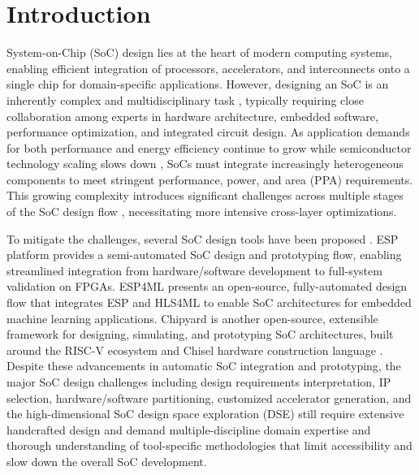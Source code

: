 \section{Introduction}
System-on-Chip (SoC) design lies at the heart of modern computing systems, enabling efficient integration of processors, accelerators, and interconnects onto a single chip for domain-specific applications. However, designing an SoC is an inherently complex and multidisciplinary task \cite{soc-productivity}, typically requiring close collaboration among experts in hardware architecture, embedded software, performance optimization, and integrated circuit design. As application demands for both performance and energy efficiency continue to grow while semiconductor technology scaling slows down \cite{esmaeilzadeh2011dark} \cite{hardavellas2012rise}, SoCs must integrate increasingly heterogeneous components to meet stringent performance, power, and area (PPA) requirements. This growing complexity introduces significant challenges across multiple stages of the SoC design flow \cite{soc-challenges}, necessitating more intensive cross-layer optimizations. 

To mitigate the challenges, several SoC design tools have been proposed \cite{esp4ml, amid2020chipyard, mantovani2020openesp}. ESP platform \cite{mantovani2020openesp} provides a semi-automated SoC design and prototyping flow, enabling streamlined integration from hardware/software development to full-system validation on FPGAs. ESP4ML\cite{esp4ml} presents an open-source, fully-automated design flow that integrates ESP and HLS4ML \cite{fahim2021hls4mlopensourcecodesignworkflow} to enable SoC architectures for embedded machine learning applications. Chipyard \cite{amid2020chipyard} is another open-source, extensible framework for designing, simulating, and prototyping SoC architectures, built around the RISC-V ecosystem and Chisel hardware construction language \cite{Chisel}. Despite these advancements in automatic SoC integration and prototyping, the major SoC design challenges including design requirements interpretation, IP selection, hardware/software partitioning, customized accelerator generation, and the high-dimensional SoC design space exploration (DSE) still require extensive handcrafted design and demand multiple-discipline domain expertise and thorough understanding of tool-specific methodologies that limit accessibility and slow down the overall SoC development.


